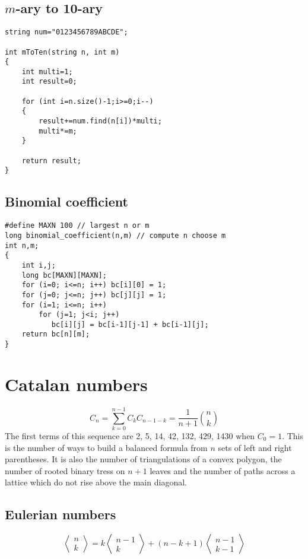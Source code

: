 \documentclass[a4paper]{article}
\begin{document}
\subsection{$m$-ary to 10-ary}

\begin{verbatim}
string num="0123456789ABCDE";

int mToTen(string n, int m)
{
	int multi=1;
	int result=0;

	for (int i=n.size()-1;i>=0;i--)
	{
		result+=num.find(n[i])*multi;
		multi*=m;
	}

	return result;
}
\end{verbatim}

\subsection{Binomial coefficient}

\begin{verbatim}
#define MAXN 100 // largest n or m
long binomial_coefficient(n,m) // compute n choose m
int n,m;
{
    int i,j;
    long bc[MAXN][MAXN];
    for (i=0; i<=n; i++) bc[i][0] = 1;
    for (j=0; j<=n; j++) bc[j][j] = 1;
    for (i=1; i<=n; i++)
        for (j=1; j<i; j++)
           bc[i][j] = bc[i-1][j-1] + bc[i-1][j];
    return bc[n][m];
}
\end{verbatim}

\section{Catalan numbers}

\begin{equation}
	C_{n}=\sum_{k=0}^{n-1}C_{k}C_{n-1-k}=\frac{1}{n+1}{n\choose k}
\end{equation}
The first terms of this sequence are 2, 5, 14, 42, 132, 429, 1430 when $C_{0} = 1$. This is the number of ways to build a balanced formula from $n$ sets of left and right parentheses. It is also the number of triangulations of a convex polygon, the number of rooted binary tress on $n+1$ leaves and the number of paths across a lattice which do not rise above the main diagonal.

\subsection{Eulerian numbers}

\begin{equation}
\left\langle\begin{matrix}
n \\ k
\end{matrix}\right\rangle=k\left\langle\begin{matrix}
n-1 \\ k
\end{matrix}\right\rangle+(n-k+1)\left\langle\begin{matrix}
n-1 \\ k-1
\end{matrix}\right\rangle
\end{equation}
\end{document}
